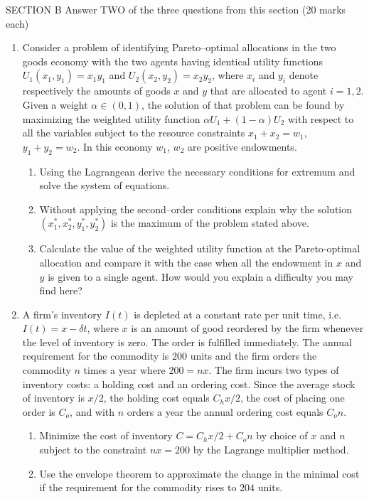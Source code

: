 \documentclass[12pt]{article} %
\theoremstyle{definition} %
\begin{document}
SECTION B
Answer TWO of the three questions from this section (20 marks each)
\begin{enumerate}[resume]
\item Consider a problem of identifying Pareto–optimal allocations in the two goods
economy with the two agents having identical utility functions $U_1(x_1 , y_1)= x_1 y_1$ and
$U_2(x_2, y_2) = x_2 y_2$, where $x_i$ and $y_i$ denote respectively the amounts of goods $x$ and $y$ that are allocated to agent $i = 1, 2$. Given a weight $\alpha \in (0, 1)$, the solution of that problem can be found by maximizing the weighted utility function $\alpha U_1 + (1 - \alpha)U_2$ with respect to all the variables subject to the resource constraints $x_1 + x_2 = w_1$, $y_1 + y_2 = w_2$. In this economy $w_1$, $w_2$ are positive endowments.
\begin{enumerate}
\item Using the Lagrangean derive the necessary conditions for extremum and solve the
system of equations.
\item Without applying the second–order conditions explain why the solution
$(x_1^* , x_2^* , y_1^* , y_2^* )$
is the maximum of the problem stated above.
\item Calculate the value of the weighted utility function at the Pareto-optimal allocation and compare it with the case when all the endowment in $x$ and $y$ is given to a single
agent. How would you explain a difficulty you may find here?
\end{enumerate}

\item A firm’s inventory $I(t)$ is depleted at a constant rate per unit time, i.e. $I(t) = x-\delta t$, where $x$ is an amount of good reordered by the firm whenever the level of inventory is
zero. The order is fulfilled immediately. The annual requirement for the commodity is
$200$ units and the firm orders the commodity $n$ times a year where $200 = nx$. The firm
incurs two types of inventory costs: a holding cost and an ordering cost. Since the average
stock of inventory is $x/2$, the holding cost equals $C_h x/2$, the cost of placing one order is
$C_o$, and with $n$ orders a year the annual ordering cost equals $C_o n$.
\begin{enumerate}
\item Minimize the cost of inventory $C = C_h x/2 + C_o n$ by choice of $x$ and $n$ subject to
the constraint $nx = 200$ by the Lagrange multiplier method.
\item Use the envelope theorem to approximate the change in the minimal cost if the
requirement for the commodity rises to $204$ units.
\end{enumerate}



\end{enumerate}
\end{document}
